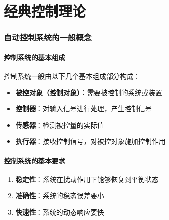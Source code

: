 \part{经典控制理论}

\section{自动控制系统的一般概念}

\subsection{控制系统的基本组成}
控制系统一般由以下几个基本组成部分构成：
\begin{itemize}
    \item \textbf{被控对象（控制对象）}：需要被控制的系统或装置
    \item \textbf{控制器}：对输入信号进行处理，产生控制信号
    \item \textbf{传感器}：检测被控量的实际值
    \item \textbf{执行器}：接收控制信号，对被控对象施加控制作用
\end{itemize}

\subsection{控制系统的基本要求}
\begin{enumerate}
    \item \textbf{稳定性}：系统在扰动作用下能够恢复到平衡状态
    \item \textbf{准确性}：系统的稳态误差要小
    \item \textbf{快速性}：系统的动态响应要快
\end{enumerate}


